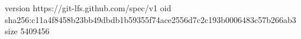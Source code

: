 version https://git-lfs.github.com/spec/v1
oid sha256:c11a4f8458b23bb49dbdb1b59355f74ace2556d7c2c193b0006483c57b266ab3
size 5409456
